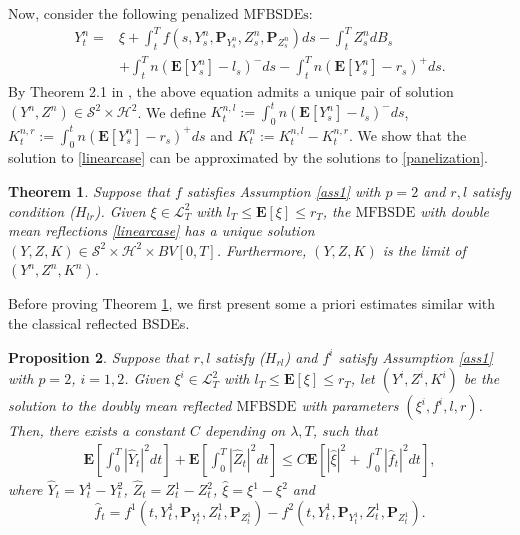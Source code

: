 \documentclass[10pt]{article}%
\numberwithin{equation}{section}
\newtheorem{theorem}{Theorem}[section]
\newtheorem{definition}[theorem]{Definition}
\newtheorem{proposition}[theorem]{Proposition}
\def \E{\mathbf{E}}
\def \P{\mathbf{P}}
\begin{document}



Now, consider the following penalized $\text{MFBSDEs}$:
\begin{equation}\begin{split}\label{panelization}
Y_t^n=&\xi+\int_t^T f(s,Y_s^n,\P_{Y_s^n},Z_s^n,\P_{Z^n_s})ds-\int_t^T Z_s^n dB_s\\
&+\int_t^T n(\E[Y_s^n]-l_s)^-ds-\int_t^T n(\E[Y_s^n]-r_s)^+ ds.
\end{split}\end{equation}
By Theorem 2.1 in \cite{LLZ}, the above equation admits a unique pair of solution $(Y^n,Z^n)\in \mathcal{S}^2\times \mathcal{H}^2$. We define $K^{n,l}_t:=\int_0^t n(\E[Y_s^n]-l_s)^- ds$, $K^{n,r}_t:=\int_0^t n(\E[Y_s^n]-r_s)^+ds$ and $K_t^n:=K^{n,l}_t-K^{n,r}_t$. We show that the solution to \eqref{linearcase} can be approximated by the solutions to \eqref{panelization}.

\begin{theorem}\label{existence and uniqueness}
Suppose that $f$ satisfies Assumption \ref{ass1} with $p=2$ and $r,l$ satisfy condition ($H_{lr}$). Given $\xi\in \mathcal{L}^2_T$ with $l_T\leq \E[\xi]\leq r_T$, the $\text{MFBSDE}$ with double mean reflections \eqref{linearcase} has a unique solution $(Y,Z,K)\in \mathcal{S}^2\times\mathcal{H}^2\times BV[0,T]$. Furthermore, $(Y,Z,K)$ is the limit of $(Y^n,Z^n,K^n)$.
\end{theorem}

Before proving Theorem \ref{existence and uniqueness}, we first present some a priori estimates similar with the classical reflected BSDEs.%
\begin{proposition}\label{uniquenesslinear}
Suppose that $r,l$ satisfy ($H_{rl}$) and $f^i$ satisfy Assumption \ref{ass1} with $p=2$, $i=1,2$. Given $\xi^i\in \mathcal{L}^2_T$ with $l_T\leq \E[\xi]\leq r_T$, let $(Y^i,Z^i,K^i)$ be the solution to the doubly mean reflected $\text{MFBSDE}$ with parameters $(\xi^i,f^i,l,r)$. Then, there exists a constant $C$ depending on $\lambda,T$, such that 
\begin{align*}
\E\left[\int_0^T |\hat{Y}_t|^2dt\right]+\E\left[\int_0^T |\hat{Z}_t|^2 dt\right]\leq C\E\left[|\hat{\xi}|^2+\int_0^T |\hat{f}_t|^2dt\right],
\end{align*}
where $\hat{Y}_t=Y^1_t-Y^2_t$, $\hat{Z}_t=Z^1_t-Z^2_t$, $\hat{\xi}=\xi^1-\xi^2$ and $$\hat{f}_t=f^1(t,Y^1_t,\P_{Y^1_t},Z^1_t,\P_{Z^1_t})-f^2(t,Y^1_t,\P_{Y^1_t},Z_t^1,\P_{Z_t^1}).$$
\end{proposition}
\end{document}
